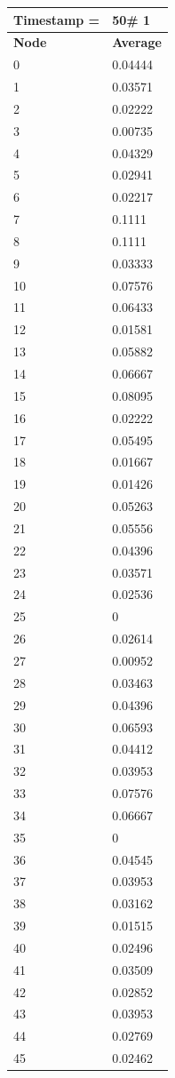 \begin{tabular}{|l||l|}
\hline
\textbf{Timestamp =} & \textbf{50}\# 1\\\hline
	\textbf{Node} & \textbf{Average} \\ \hline
\hline
	0 & 0.04444 \\ \hline
	1 & 0.03571 \\ \hline
	2 & 0.02222 \\ \hline
	3 & 0.00735 \\ \hline
	4 & 0.04329 \\ \hline
	5 & 0.02941 \\ \hline
	6 & 0.02217 \\ \hline
	7 & 0.1111 \\ \hline
	8 & 0.1111 \\ \hline
	9 & 0.03333 \\ \hline
	10 & 0.07576 \\ \hline
	11 & 0.06433 \\ \hline
	12 & 0.01581 \\ \hline
	13 & 0.05882 \\ \hline
	14 & 0.06667 \\ \hline
	15 & 0.08095 \\ \hline
	16 & 0.02222 \\ \hline
	17 & 0.05495 \\ \hline
	18 & 0.01667 \\ \hline
	19 & 0.01426 \\ \hline
	20 & 0.05263 \\ \hline
	21 & 0.05556 \\ \hline
	22 & 0.04396 \\ \hline
	23 & 0.03571 \\ \hline
	24 & 0.02536 \\ \hline
	25 & 0 \\ \hline
	26 & 0.02614 \\ \hline
	27 & 0.00952 \\ \hline
	28 & 0.03463 \\ \hline
	29 & 0.04396 \\ \hline
	30 & 0.06593 \\ \hline
	31 & 0.04412 \\ \hline
	32 & 0.03953 \\ \hline
	33 & 0.07576 \\ \hline
	34 & 0.06667 \\ \hline
	35 & 0 \\ \hline
	36 & 0.04545 \\ \hline
	37 & 0.03953 \\ \hline
	38 & 0.03162 \\ \hline
	39 & 0.01515 \\ \hline
	40 & 0.02496 \\ \hline
	41 & 0.03509 \\ \hline
	42 & 0.02852 \\ \hline
	43 & 0.03953 \\ \hline
	44 & 0.02769 \\ \hline
	45 & 0.02462 \\ \hline
\end{tabular}
